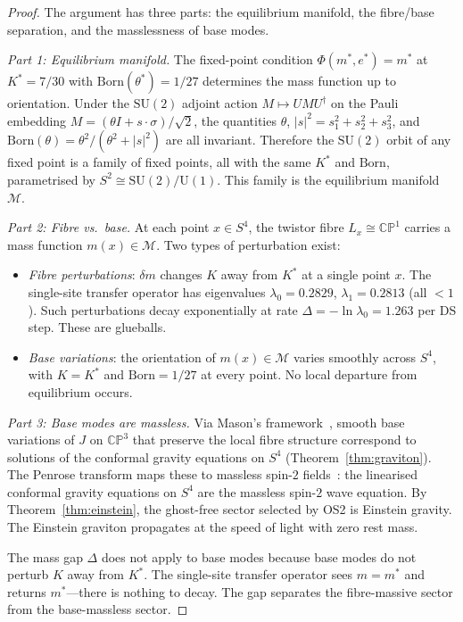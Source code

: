 \documentclass[11pt,a4paper]{article}
\theoremstyle{definition}
\theoremstyle{remark}
\newcommand{\CP}{\mathbb{CP}}
\newcommand{\SU}{\mathrm{SU}}
\begin{document}
\begin{proof}
The argument has three parts: the equilibrium manifold, the fibre/base separation, and the masslessness of base modes.

\emph{Part 1: Equilibrium manifold.} The fixed-point condition $\Phi(m^*,e^*)=m^*$ at $K^*=7/30$ with $\mathrm{Born}(\theta^*)=1/27$ determines the mass function up to orientation. Under the $\SU(2)$ adjoint action $M\mapsto UMU^\dagger$ on the Pauli embedding $M=(\theta I+s\cdot\sigma)/\sqrt{2}$, the quantities $\theta$, $|s|^2=s_1^2+s_2^2+s_3^2$, and $\mathrm{Born}(\theta)=\theta^2/(\theta^2+|s|^2)$ are all invariant. Therefore the $\SU(2)$ orbit of any fixed point is a family of fixed points, all with the same $K^*$ and $\mathrm{Born}$, parametrised by $S^2\cong\SU(2)/\mathrm{U}(1)$. This family is the equilibrium manifold $\mathcal{M}$.

\emph{Part 2: Fibre vs.\ base.} At each point $x\in S^4$, the twistor fibre $L_x\cong\CP^1$ carries a mass function $m(x)\in\mathcal{M}$. Two types of perturbation exist:
\begin{itemize}[nosep]
\item \emph{Fibre perturbations}: $\delta m$ changes $K$ away from $K^*$ at a single point $x$. The single-site transfer operator has eigenvalues $\lambda_0=0.2829$, $\lambda_1=0.2813$ (all $<1$). Such perturbations decay exponentially at rate $\Delta=-\ln\lambda_0=1.263$ per DS step. These are glueballs.
\item \emph{Base variations}: the orientation of $m(x)\in\mathcal{M}$ varies smoothly across $S^4$, with $K=K^*$ and $\mathrm{Born}=1/27$ at every point. No local departure from equilibrium occurs.
\end{itemize}

\emph{Part 3: Base modes are massless.} Via Mason's framework~\cite{Mason2005}, smooth base variations of $J$ on $\CP^3$ that preserve the local fibre structure correspond to solutions of the conformal gravity equations on $S^4$ (Theorem~\ref{thm:graviton}). The Penrose transform maps these to massless spin-$2$ fields~\cite{AHS1978,LeBrunMason}: the linearised conformal gravity equations on $S^4$ are the massless spin-$2$ wave equation. By Theorem~\ref{thm:einstein}, the ghost-free sector selected by OS2 is Einstein gravity. The Einstein graviton propagates at the speed of light with zero rest mass.

The mass gap $\Delta$ does not apply to base modes because base modes do not perturb $K$ away from $K^*$. The single-site transfer operator sees $m=m^*$ and returns $m^*$---there is nothing to decay. The gap separates the fibre-massive sector from the base-massless sector.
\end{proof}
\end{document}
